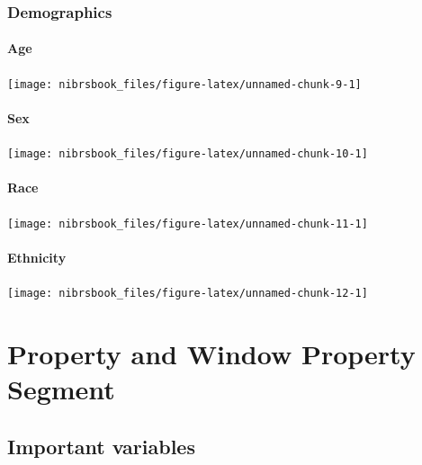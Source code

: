 \documentclass[
  12pt,
  openany]{book}
\begin{document}
\hypertarget{demographics-1}{%
\subsection{Demographics}\label{demographics-1}}

\hypertarget{age-2}{%
\subsubsection{Age}\label{age-2}}

\begin{center}\texttt{[image: nibrsbook\_files/figure-latex/unnamed-chunk-9-1]} \end{center}

\hypertarget{sex-2}{%
\subsubsection{Sex}\label{sex-2}}

\begin{center}\texttt{[image: nibrsbook\_files/figure-latex/unnamed-chunk-10-1]} \end{center}

\hypertarget{race-2}{%
\subsubsection{Race}\label{race-2}}

\begin{center}\texttt{[image: nibrsbook\_files/figure-latex/unnamed-chunk-11-1]} \end{center}

\hypertarget{ethnicity-1}{%
\subsubsection{Ethnicity}\label{ethnicity-1}}

\begin{center}\texttt{[image: nibrsbook\_files/figure-latex/unnamed-chunk-12-1]} \end{center}

\hypertarget{property-and-window-property-segment}{%
\chapter{Property and Window Property Segment}\label{property-and-window-property-segment}}

\hypertarget{important-variables-5}{%
\section{Important variables}\label{important-variables-5}}
\end{document}
